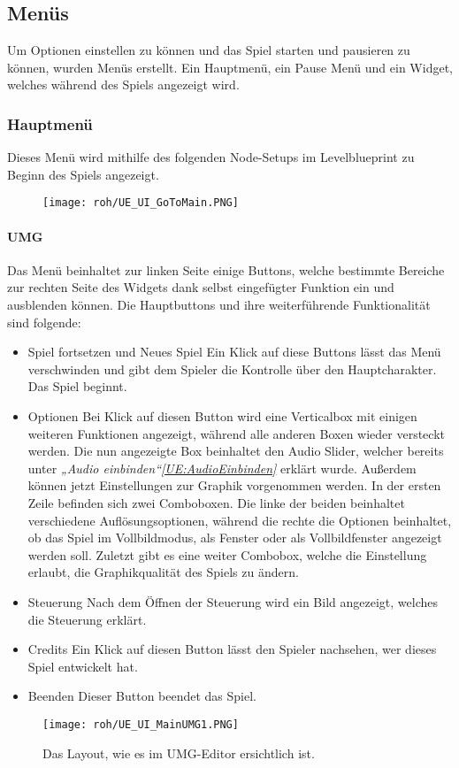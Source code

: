 \subsection{Menüs}
Um Optionen einstellen zu können und das Spiel starten und pausieren zu können, wurden Menüs erstellt. Ein Hauptmenü, ein Pause Menü und ein Widget, welches während des Spiels angezeigt wird.
\subsubsection{Hauptmenü}
Dieses Menü wird mithilfe des folgenden Node-Setups im Levelblueprint zu Beginn des Spiels angezeigt.
\begin{figure}[H]
    \centering
    \texttt{[image: roh/UE\_UI\_GoToMain.PNG]}
    \label{UE:UI_GoToMain}
\end{figure}
\paragraph{UMG}
Das Menü beinhaltet zur linken Seite einige Buttons, welche bestimmte Bereiche zur rechten Seite des Widgets dank selbst eingefügter Funktion ein und ausblenden können.
Die Hauptbuttons und ihre weiterführende Funktionalität sind folgende:
\begin{itemize}
    \item Spiel fortsetzen und Neues Spiel
    Ein Klick auf diese Buttons lässt das Menü verschwinden und gibt dem Spieler die Kontrolle über den Hauptcharakter. Das Spiel beginnt.
    \item Optionen
    Bei Klick auf diesen Button wird eine Verticalbox mit einigen weiteren Funktionen angezeigt, während alle anderen Boxen wieder versteckt werden. Die nun angezeigte Box beinhaltet den Audio Slider, welcher bereits unter \textit{„Audio einbinden“\ref{UE:AudioEinbinden}} erklärt wurde. Außerdem können jetzt Einstellungen zur Graphik vorgenommen werden. In der ersten Zeile befinden sich zwei Comboboxen. Die linke der beiden beinhaltet verschiedene Auflösungsoptionen, während die rechte die Optionen beinhaltet, ob das Spiel im Vollbildmodus, als Fenster oder als Vollbildfenster angezeigt werden soll. Zuletzt gibt es eine weiter Combobox, welche die Einstellung erlaubt, die Graphikqualität des Spiels zu ändern.
    \item Steuerung
    Nach dem Öffnen der Steuerung wird ein Bild angezeigt, welches die Steuerung erklärt.
    \item Credits
    Ein Klick auf diesen Button lässt den Spieler nachsehen, wer dieses Spiel entwickelt hat.
    \item Beenden
    Dieser Button beendet das Spiel.
\end{itemize}
\begin{figure}[H]
    \centering
    \texttt{[image: roh/UE\_UI\_MainUMG1.PNG]}
    \caption{Das Layout, wie es im UMG-Editor ersichtlich ist.}
    \label{UE:UI_MainUMG1}
\end{figure}
